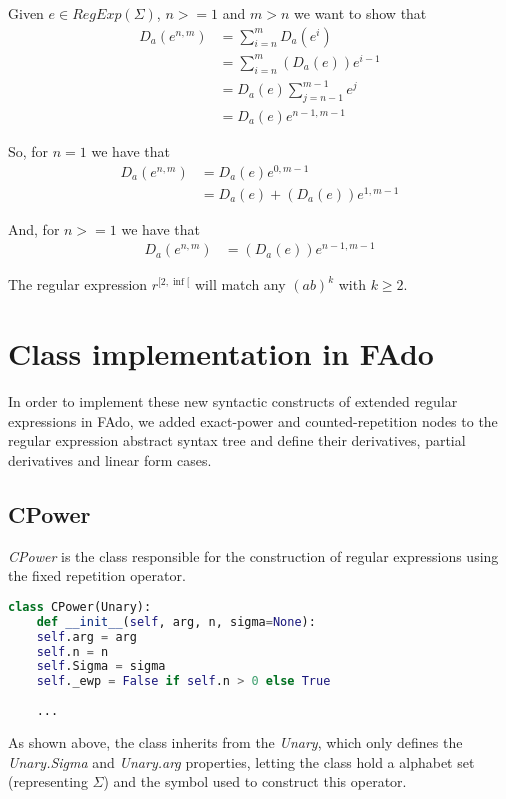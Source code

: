\noindent Given $e \in RegExp(\Sigma)$, $n>=1$ and $m>n$ we want to show that
\begin{align*}
	D_a(e^{n,m}) &= \sum_{i=n}^{m} D_a(e^i) \\
	&= \sum_{i=n}^{m} (D_a(e))e^{i-1} \\
	&= D_a(e) \sum_{j=n-1}^{m-1} e^j \\
	&= D_a(e) e^{n-1,m-1}
\end{align*}

\noindent So, for $n=1$ we have that
\begin{align*}
	D_a(e^{n,m}) &= D_a(e)e^{0,m-1} \\
	&= D_a(e) + (D_a(e))e^{1,m-1}
\end{align*}

\noindent And, for $n>=1$ we have that
\begin{align*}
	D_a(e^{n,m}) &= (D_a(e))e^{n-1,m-1}
\end{align*}

The regular expression $r^{[2, \inf[}$ will match any $(ab)^k$ with $k \geq 2$.




\section{Class implementation in FAdo}
In order to implement these new syntactic constructs of extended regular expressions in FAdo, we added exact-power and counted-repetition nodes to the regular expression abstract syntax tree and define their derivatives, partial derivatives and linear form cases.

\subsection{CPower}
\textit{CPower} is the class responsible for the construction of regular expressions using the fixed repetition operator.

\begin{lstlisting}[language=Python]
class CPower(Unary):
	def __init__(self, arg, n, sigma=None):
	self.arg = arg
	self.n = n
	self.Sigma = sigma
	self._ewp = False if self.n > 0 else True
	
	...
\end{lstlisting}

As shown above, the class inherits from the \textit{Unary}, which only defines the \textit{Unary.Sigma} and \textit{Unary.arg} properties, letting the class hold a alphabet set (representing $\Sigma$) and the symbol used to construct this operator.

